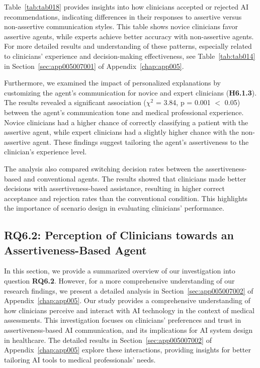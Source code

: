 \textcolor{revised}{Table~\ref{tab:tab018} provides insights into how clinicians accepted or rejected \ac{AI} recommendations, indicating differences in their responses to assertive versus non-assertive communication styles.
This table shows novice clinicians favor assertive agents, while experts achieve better accuracy with non-assertive agents.
For more detailed results and understanding of these patterns, especially related to clinicians' experience and decision-making effectiveness, see Table~\ref{tab:tab014} in Section~\ref{sec:app005007001} of Appendix~\ref{chap:app005}.}



Furthermore, we examined the impact of personalized explanations by customizing the agent's communication for novice and expert clinicians (\textbf{H6.1.3}).
The results revealed a significant association ($\chi^2$ = 3.84, p = 0.001 $<$ 0.05) between the agent's communication tone and medical professional experience.
Novice clinicians had a higher chance of correctly classifying a patient with the assertive agent, while expert clinicians had a slightly higher chance with the non-assertive agent.
These findings suggest tailoring the agent's assertiveness to the clinician's experience level.

The analysis also compared switching decision rates between the assertiveness-based and conventional agents.
The results showed that clinicians made better decisions with assertiveness-based assistance, resulting in higher correct acceptance and rejection rates than the conventional condition.
This highlights the importance of scenario design in evaluating clinicians' performance.

\subsection{RQ6.2: Perception of Clinicians towards an Assertiveness-Based Agent}
\label{sec:chap006006002}

\textcolor{revised}{In this section, we provide a summarized overview of our investigation into question {\bf RQ6.2}.
However, for a more comprehensive understanding of our research findings, we present a detailed analysis in Section~\ref{sec:app005007002} of Appendix~\ref{chap:app005}.
Our study provides a comprehensive understanding of how clinicians perceive and interact with \ac{AI} technology in the context of medical assessments.
This investigation focuses on clinicians' preferences and trust in assertiveness-based \ac{AI} communication, and its implications for \ac{AI} system design in healthcare.
The detailed results in Section~\ref{sec:app005007002} of Appendix~\ref{chap:app005} explore these interactions, providing insights for better tailoring \ac{AI} tools to medical professionals' needs.}

